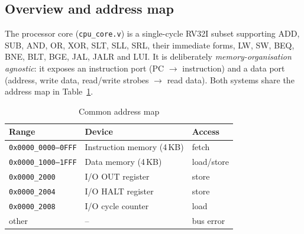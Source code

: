 \documentclass[conference]{IEEEtran}
\begin{document}
\subsection{Overview and address map}
The processor core (\texttt{cpu\_core.v}) is a single-cycle RV32I subset
\cite{riscv_isa} supporting ADD, SUB, AND, OR, XOR, SLT, SLL, SRL, their
immediate forms, LW, SW, BEQ, BNE, BLT, BGE, JAL, JALR and LUI. It is
deliberately \emph{memory-organisation agnostic}: it exposes an instruction
port (PC $\rightarrow$ instruction) and a data port (address, write data,
read/write strobes $\rightarrow$ read data). Both systems share the address
map in Table~\ref{tab:map}.

\begin{table}[h]
\caption{Common address map}
\label{tab:map}
\centering
\begin{tabular}{lll}
\toprule
Range & Device & Access \\
\midrule
\texttt{0x0000\_0000--0FFF} & Instruction memory (4\,KB) & fetch \\
\texttt{0x0000\_1000--1FFF} & Data memory (4\,KB) & load/store \\
\texttt{0x0000\_2000} & I/O OUT register & store \\
\texttt{0x0000\_2004} & I/O HALT register & store \\
\texttt{0x0000\_2008} & I/O cycle counter & load \\
other & -- & bus error \\
\bottomrule
\end{tabular}
\end{table}
\end{document}
